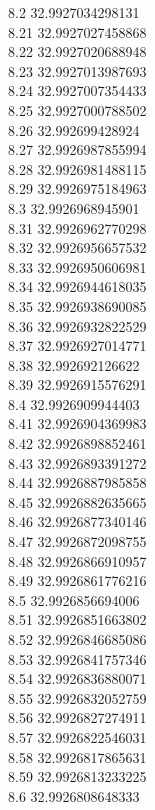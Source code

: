 {8.2	32.9927034298131\\
8.21	32.9927027458868\\
8.22	32.9927020688948\\
8.23	32.9927013987693\\
8.24	32.9927007354433\\
8.25	32.9927000788502\\
8.26	32.992699428924\\
8.27	32.9926987855994\\
8.28	32.9926981488115\\
8.29	32.9926975184963\\
8.3	32.9926968945901\\
8.31	32.9926962770298\\
8.32	32.9926956657532\\
8.33	32.9926950606981\\
8.34	32.9926944618035\\
8.35	32.9926938690085\\
8.36	32.9926932822529\\
8.37	32.9926927014771\\
8.38	32.992692126622\\
8.39	32.9926915576291\\
8.4	32.9926909944403\\
8.41	32.9926904369983\\
8.42	32.9926898852461\\
8.43	32.9926893391272\\
8.44	32.9926887985858\\
8.45	32.9926882635665\\
8.46	32.9926877340146\\
8.47	32.9926872098755\\
8.48	32.9926866910957\\
8.49	32.9926861776216\\
8.5	32.9926856694006\\
8.51	32.9926851663802\\
8.52	32.9926846685086\\
8.53	32.9926841757346\\
8.54	32.9926836880071\\
8.55	32.9926832052759\\
8.56	32.9926827274911\\
8.57	32.9926822546031\\
8.58	32.9926817865631\\
8.59	32.9926813233225\\
8.6	32.9926808648333\\
}

